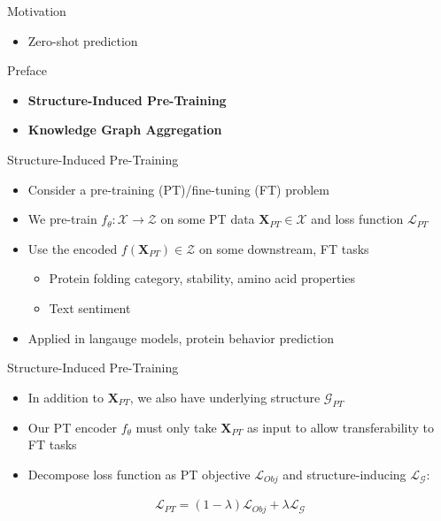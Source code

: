 \documentclass{beamer}
\newcommand{\Graph}{\mathcal{G}}
\newcommand{\Loss}{\mathcal{L}}
\begin{document}
\begin{frame}{Motivation}
    \begin{itemize}
        \item Zero-shot prediction 
    \end{itemize}
\end{frame}


\begin{frame}{Preface}
    \begin{itemize}
        \item \textbf{Structure-Induced Pre-Training}
        \item \textbf{Knowledge Graph Aggregation}
    \end{itemize}
\end{frame}
\begin{frame}{Structure-Induced Pre-Training}
    \begin{itemize}
        \item Consider a pre-training (PT)/fine-tuning (FT) problem 
        \item We pre-train $f_\theta:\mathcal{X}\rightarrow\mathcal{Z}$ on some PT data $\mathbf{X}_{PT} \in \mathcal{X}$ and loss function $\Loss_{PT}$
        \item Use the encoded $f(\mathbf{X}_{PT}) \in \mathcal{Z}$ on some downstream, FT tasks 
        \begin{itemize}
            \item Protein folding category, stability, amino acid properties 
            \item Text sentiment 
        \end{itemize}
        \item Applied in langauge models, protein behavior prediction 
    \end{itemize}
\end{frame}

\begin{frame}{Structure-Induced Pre-Training}
    \begin{itemize}
        \item In addition to $\mathbf{X}_{PT}$, we also have underlying structure $\Graph_{PT}$
        \item Our PT encoder $f_\theta$ must only take $\mathbf{X}_{PT}$ as input to allow transferability to FT tasks 
        \item Decompose loss function as PT objective $\Loss_{Obj}$ and structure-inducing $\Loss_\Graph$:
    \end{itemize}

    \begin{gather*}
        \Loss_{PT}
        =
        (1-\lambda)\Loss_{Obj}
        +
        \lambda \Loss_{\Graph}
    \end{gather*}
\end{frame}
\end{document}
